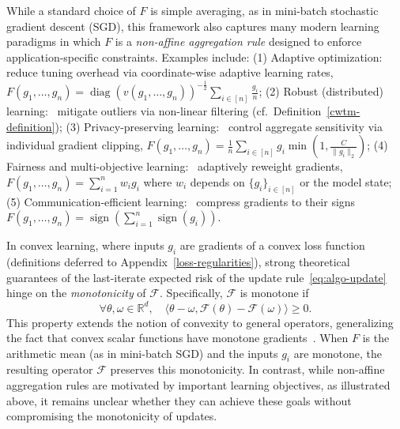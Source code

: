 \documentclass[twoside,11pt]{article}
\newcommand\mc{\mathcal}
\newcommand{\R}{\mathbb{R}}
\newcommand{\F}{\mathcal{F}}
\let\todo\relax%
\newcommand{\comm}[3][inline]{\todo[#1, size=\tiny]{#2: #3}}
\newcommand{\tb}[1]{\textcolor{orange}{#1}}
\newcommand{\autodo}[2][inline]{\comm[color=green,#1]{AB}{#2}}
\begin{document}
While a standard choice of $F$ is simple averaging, as in mini-batch stochastic gradient descent (SGD), this framework also captures many modern learning paradigms in which $F$ is a \emph{non-affine aggregation rule} designed to enforce application-specific constraints.
Examples include:
(1) Adaptive optimization:~\citet{kingma2017adammethodstochasticoptimization} reduce tuning overhead via coordinate-wise adaptive learning rates, $F(g_1,\ldots,g_n) = \operatorname{diag}(v(g_1, \ldots, g_n))^{-\frac{1}{2}} \sum_{i\in[n]} \frac{g_i}{n}$; %
(2) Robust (distributed) learning:~\citet{pmlr-v206-allouah23a,Diakonikolas_Kane_2023} mitigate outliers via non-linear filtering (cf.\ Definition~\ref{cwtm-definition});
(3) Privacy-preserving learning:~\citet{Abadi_2016} control aggregate sensitivity via individual gradient clipping, $F(g_1, \ldots, g_n) = \frac{1}{n}\sum_{i\in[n]} g_i \min(1, \frac{C}{\|g_i\|_2})$;
(4) Fairness and multi-objective learning:~\citet{pmlr-v80-hashimoto18a} adaptively reweight gradients, $F(g_1,\ldots,g_n) = \sum_{i=1}^n w_i g_i$ where $w_i$ depends on $\{g_i\}_{i\in[n]}$ or the model state; %
(5) Communication-efficient learning:~\cite{bernstein2018signsgd} compress gradients to their signs $F(g_1, \ldots, g_n) = \operatorname{sign}(\sum_{i=1}^n \operatorname{sign}(g_i))$.

In convex learning, where inputs $g_i$ are gradients of a convex loss function (definitions deferred to Appendix~\ref{loss-regularities}), strong theoretical guarantees of the last-iterate expected risk of the update rule~\eqref{eq:algo-update} hinge on the \emph{monotonicity} of $\F$. 
Specifically, $\F$ is monotone if
\begin{equation}\label{eq:operator-convexity}
    \forall \theta, \omega \in \R^d,\quad \langle \theta - \omega, \F(\theta) - \F(\omega) \rangle \geq 0.
\end{equation}
This property extends the notion of convexity to general operators, generalizing the fact that convex scalar functions have monotone gradients~\citep[Proposition 17.10]{Bauschke2011ConvexAA}.
When $F$ is the arithmetic mean (as in mini-batch SGD) and the inputs $g_i$ are monotone, the resulting operator $\F$ preserves this monotonicity. 
In contrast, while non-affine aggregation rules are motivated by important learning objectives, as illustrated above, it remains unclear whether they can achieve these goals without compromising the monotonicity of updates.
\end{document}
